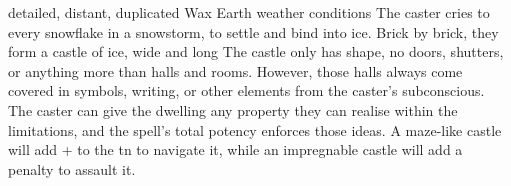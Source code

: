   {detailed, distant, duplicated}%
  {Wax}%
  {Earth}%
  {weather conditions}%
  {The caster cries to every snowflake in a snowstorm, to settle and bind into ice.
    Brick by brick, they form a castle of ice,  wide and long}%
  {
    The castle only has shape, no doors, shutters, or anything more than halls and rooms.
    However, those halls always come covered in symbols, writing, or other elements from the caster's subconscious.
    The caster can give the dwelling any property they can realise within the limitations, and the spell's total potency enforces those ideas.
    A maze-like castle will add + to the \gls{tn} to navigate it, while an impregnable castle will add a penalty to assault it.
  }

